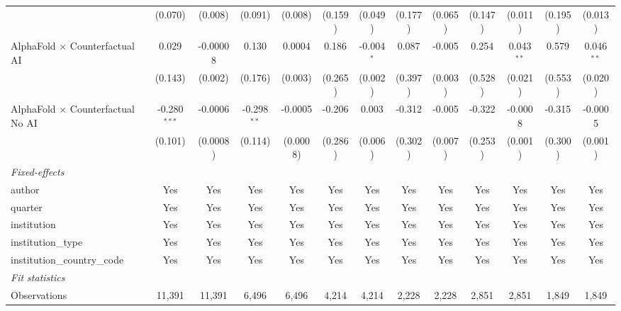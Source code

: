 \begin{tabular}{lcccccccccccc}
                                            & (0.070)        & (0.008)  & (0.091)       & (0.008)  & (0.159)     & (0.049)      & (0.177) & (0.065) & (0.147) & (0.011)       & (0.195)      & (0.013)\\   
   AlphaFold $\times$ Counterfactual AI     & 0.029          & -0.00008 & 0.130         & 0.0004   & 0.186       & -0.004$^{*}$ & 0.087   & -0.005  & 0.254   & 0.043$^{**}$  & 0.579        & 0.046$^{**}$\\   
                                            & (0.143)        & (0.002)  & (0.176)       & (0.003)  & (0.265)     & (0.002)      & (0.397) & (0.003) & (0.528) & (0.021)       & (0.553)      & (0.020)\\   
   AlphaFold $\times$ Counterfactual No AI  & -0.280$^{***}$ & -0.0006  & -0.298$^{**}$ & -0.0005  & -0.206      & 0.003        & -0.312  & -0.005  & -0.322  & -0.0008       & -0.315       & -0.0005\\   
                                            & (0.101)        & (0.0008) & (0.114)       & (0.0008) & (0.286)     & (0.006)      & (0.302) & (0.007) & (0.253) & (0.001)       & (0.300)      & (0.001)\\   
   \midrule
   \emph{Fixed-effects}\\
   author                                   & Yes            & Yes      & Yes           & Yes      & Yes         & Yes          & Yes     & Yes     & Yes     & Yes           & Yes          & Yes\\  
   quarter                                  & Yes            & Yes      & Yes           & Yes      & Yes         & Yes          & Yes     & Yes     & Yes     & Yes           & Yes          & Yes\\  
   institution                              & Yes            & Yes      & Yes           & Yes      & Yes         & Yes          & Yes     & Yes     & Yes     & Yes           & Yes          & Yes\\  
   institution\_type                        & Yes            & Yes      & Yes           & Yes      & Yes         & Yes          & Yes     & Yes     & Yes     & Yes           & Yes          & Yes\\  
   institution\_country\_code               & Yes            & Yes      & Yes           & Yes      & Yes         & Yes          & Yes     & Yes     & Yes     & Yes           & Yes          & Yes\\  
   \midrule
   \emph{Fit statistics}\\
   Observations                             & 11,391         & 11,391   & 6,496         & 6,496    & 4,214       & 4,214        & 2,228   & 2,228   & 2,851   & 2,851         & 1,849        & 1,849\\  

\end{tabular}
